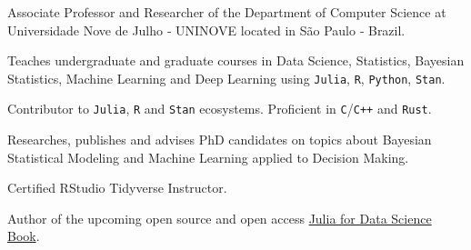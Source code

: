 \vspace{0.25cm}

\begin{cvitems}

  \item Associate Professor and Researcher of the Department of Computer Science at Universidade Nove de Julho ‑
  UNINOVE located in São Paulo ‑ Brazil.
  \item Teaches undergraduate and graduate courses in Data Science, Statistics, Bayesian Statistics,
  Machine Learning and Deep Learning using \texttt{Julia}, \texttt{R}, \texttt{Python}, \texttt{Stan}.
  \item Contributor to \texttt{Julia}, \texttt{R} and \texttt{Stan} ecosystems. Proficient in \texttt{C}/\texttt{C++} and \texttt{Rust}.
  \item Researches, publishes and advises PhD candidates on topics about Bayesian Statistical Modeling and Machine
  Learning applied to Decision Making.
  \item Certified RStudio Tidyverse Instructor.
  \item Author of the upcoming open source and open access \href{https://juliadatascience.io}{Julia for Data Science Book}.

\end{cvitems}
